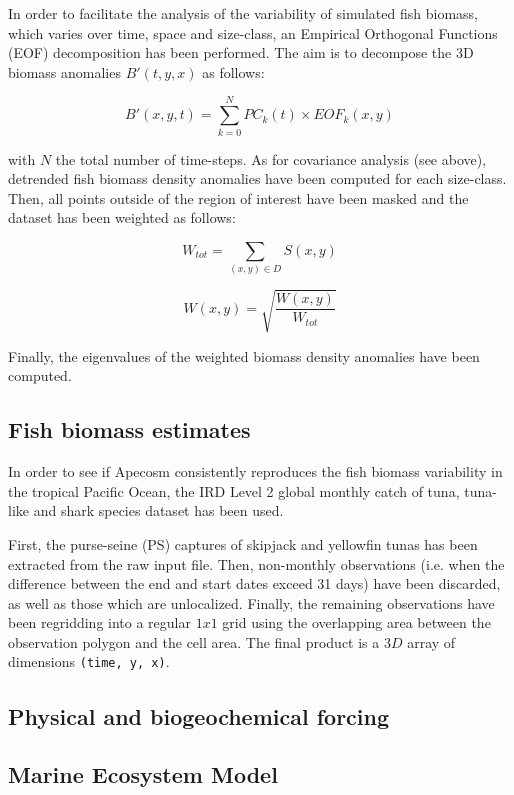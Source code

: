 In order to facilitate the analysis of the variability of simulated fish biomass, which varies over time, space and size-class, an Empirical Orthogonal Functions (EOF) decomposition has been performed. The aim is to decompose the 3D biomass anomalies $B'(t, y, x)$ as follows: 

\begin{equation}
B'(x,y,t) = \sum_{k=0}^{N} PC_k(t) \times EOF_k(x,y)
\end{equation}

with $N$ the total number of time-steps. As for covariance analysis (see above), detrended fish biomass density anomalies have been computed for each size-class. Then, all points outside of the region of interest have been masked and the dataset has been weighted as follows:

\begin{displaymath}
W_{tot} = \sum_{(x, y) \in D} S(x,y)
\end{displaymath}

\begin{displaymath}
W(x, y) = \sqrt{\frac{W(x, y)}{W_{tot}}}
\end{displaymath}

Finally, the eigenvalues of the weighted biomass density anomalies have been computed. 

\subsection{Fish biomass estimates}

In order to see if Apecosm consistently reproduces the fish biomass variability in the tropical Pacific Ocean, the IRD Level 2 global monthly catch of tuna, tuna-like and shark species dataset \citep{taconetGlobalMonthlyCatch2018} has been used.

First, the purse-seine (PS) captures of skipjack and yellowfin tunas has been extracted from the raw input file. Then, non-monthly observations (i.e. when the difference between the end and start dates exceed 31 days) have been discarded, as well as those which are unlocalized. Finally, the remaining observations have been regridding into a regular $1x1$ grid using the overlapping area between the observation polygon and the cell area. The final product is a $3D$ array of dimensions \verb+(time, y, x)+.

\subsection{Physical and biogeochemical forcing}


\subsection{Marine Ecosystem Model}
